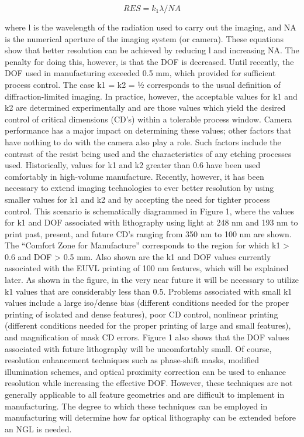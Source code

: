 \documentclass[12pt,a4paper]{report}
\begin{document}
$$RES = {k_1}{\lambda}/NA$$

where l is the wavelength of the radiation used to carry
out the imaging, and NA is the numerical aperture of the
imaging system (or camera). These equations show that
better resolution can be achieved by reducing l and
increasing NA. The penalty for doing this, however, is
that the DOF is decreased. Until recently, the DOF used
in manufacturing exceeded 0.5 mm, which provided for
sufficient process control.
The case k1 = k2 = ½ corresponds to the usual definition
of diffraction-limited imaging. In practice, however, the
acceptable values for k1 and k2 are determined
experimentally and are those values which yield the
desired control of critical dimensions (CD’s) within a
tolerable process window. Camera performance has a
major impact on determining these values; other factors
that have nothing to do with the camera also play a role.
Such factors include the contrast of the resist being used
and the characteristics of any etching processes used.
Historically, values for k1 and k2 greater than 0.6 have
been used comfortably in high-volume manufacture.
Recently, however, it has been necessary to extend
imaging technologies to ever better resolution by using
smaller values for k1 and k2 and by accepting the need for
tighter process control. This scenario is schematically
diagrammed in Figure 1, where the values for k1 and
DOF associated with lithography using light at 248 nm
and 193 nm to print past, present, and future CD’s
ranging from 350 nm to 100 nm are shown. The
“Comfort Zone for Manufacture” corresponds to the
region for which k1 > 0.6 and DOF > 0.5 mm. Also
shown are the k1 and DOF values currently associated
with the EUVL printing of 100 nm features, which will
be explained later. As shown in the figure, in the very
near future it will be necessary to utilize k1 values that
are considerably less than 0.5. Problems associated with
small k1 values include a large iso/dense bias (different
conditions needed for the proper printing of isolated and
dense features), poor CD control, nonlinear printing
(different conditions needed for the proper printing of
large and small features), and magnification of mask CD
errors. Figure 1 also shows that the DOF values
associated with future lithography will be uncomfortably
small. Of course, resolution enhancement techniques
such as phase-shift masks, modified illumination
schemes, and optical proximity correction can be used to
enhance resolution while increasing the effective DOF.
However, these techniques are not generally applicable to
all feature geometries and are difficult to implement in
manufacturing. The degree to which these techniques
can be employed in manufacturing will determine how
far optical lithography can be extended before an NGL is
needed.
\end{document}
